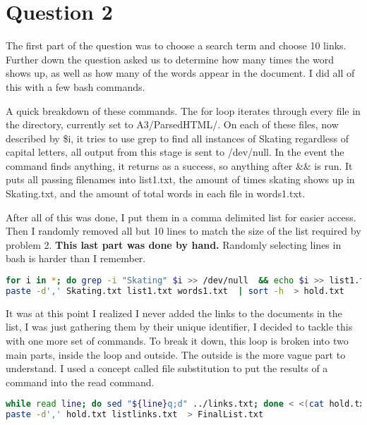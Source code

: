 \documentclass[11pt]{report}
\begin{document}
\pagebreak
\section{Question 2}
The first part of the question was to choose a search term and choose 10 links. Further down the question asked us to determine how many times the word shows up, as well as how many of the words appear in the document. I did all of this with a few bash commands. 

A quick breakdown of these commands. The for loop iterates through every file in the directory, currently set to A3/ParsedHTML/. On each of these files, now described by \$i, it tries to use grep to find all instances of Skating regardless of capital letters, all output from this stage is sent to /dev/null. In the event the command finds anything, it returns as a success, so anything after \&\& is run. It puts all passing filenames into list1.txt, the amount of times skating shows up in Skating.txt, and the amount of total words in each file in words1.txt.

After all of this was done, I put them in a comma delimited list for easier access. Then I randomly removed all but 10 lines to match the size of the list required by problem 2. \textbf{This last part was done by hand.} Randomly selecting lines in bash is harder than I remember.

\begin{lstlisting}[language=bash]
for i in *; do grep -i "Skating" $i >> /dev/null  && echo $i >> list1.txt && grep -io "Skating" $i | wc -w >> Skating.txt && wc -w $i | grep -oiE "^\S+" >> words1.txt; done 
paste -d',' Skating.txt list1.txt words1.txt  | sort -h  > hold.txt
\end{lstlisting}

It was at this point I realized I never added the links to the documents in the list, I was just gathering them by their unique identifier, I decided to tackle this with one more set of commands. To break it down, this loop is broken into two main parts, inside the loop and outside. The outside is the more vague part to understand. I used a concept called file substitution to put the results of a command into the read command. 

\begin{lstlisting}[language=bash]
while read line; do sed "${line}q;d" ../links.txt; done < <(cat hold.txt | grep -oE "[0-9]+\.txt" | grep -oE "[0-9]+") > listlinks.txt
paste -d',' hold.txt listlinks.txt  > FinalList.txt 
\end{lstlisting}
\end{document}
